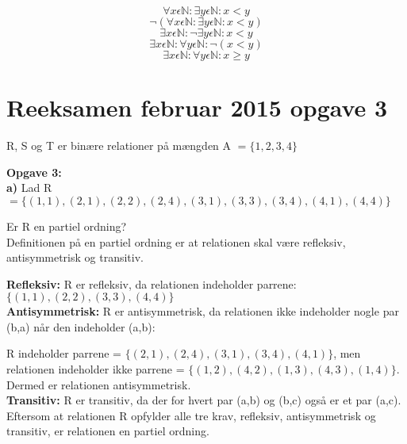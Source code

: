 \documentclass{article}
\begin{document}
\begin{displaymath}
\forall x \epsilon \mathbb{N}: \exists y \epsilon \mathbb{N}: x<y
\end{displaymath}
\begin{displaymath}
\neg (\forall x \epsilon \mathbb{N}: \exists y \epsilon \mathbb{N}: x<y)
\end{displaymath}
\begin{displaymath}
\exists x \epsilon \mathbb{N}: \neg \exists y \epsilon \mathbb{N}: x<y
\end{displaymath}
\begin{displaymath}
\exists x \epsilon \mathbb{N}: \forall y \epsilon \mathbb{N}: \neg (x<y)
\end{displaymath}
\begin{displaymath}
\exists x \epsilon \mathbb{N}: \forall y \epsilon \mathbb{N}: x\geq y
\end{displaymath}

\section{Reeksamen februar 2015 opgave 3}
R, S og T er binære relationer på mængden A \(=\lbrace1, 2, 3, 4\rbrace\)

\textbf{Opgave 3:}\\
\textbf{a)} Lad R \(=\lbrace(1,1), (2,1), (2,2), (2,4), (3,1), (3,3), (3,4), (4,1), (4,4)\rbrace\)

Er R en partiel ordning?\\


Definitionen på en partiel ordning er at relationen skal være refleksiv, antisymmetrisk og transitiv. 

\textbf{Refleksiv:} R er refleksiv, da relationen indeholder parrene: \(\lbrace(1,1), (2,2), (3,3), (4,4)\rbrace\)\\

\textbf{Antisymmetrisk:} R er antisymmetrisk, da relationen ikke indeholder nogle par (b,a) når den indeholder (a,b): 

R indeholder parrene = \(\lbrace (2,1), (2,4), (3,1), (3,4), (4,1)\rbrace\), men relationen indeholder ikke parrene = \(\lbrace (1,2), (4,2), (1,3), (4,3), (1,4)\rbrace\). Dermed er relationen antisymmetrisk.  \\

\textbf{Transitiv:} R er transitiv, da der for hvert par (a,b) og (b,c) også er et par (a,c). \\

Eftersom at relationen R opfylder alle tre krav, refleksiv, antisymmetrisk og transitiv, er relationen en partiel ordning. \\
\end{document}
